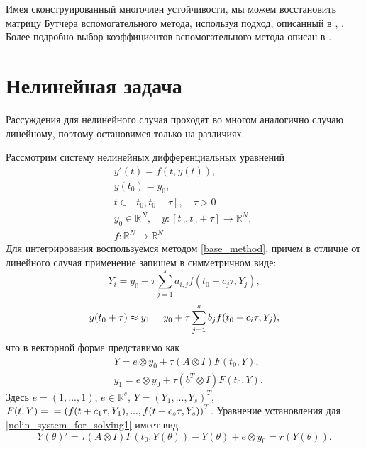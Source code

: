 \documentclass[a4paper,14pt]{extreport}
\begin{document}
Имея сконструированный многочлен устойчивости, мы можем восстановить матрицу Бутчера вспомогательного метода, используя подход, описанный в \cite{hairer}, \cite{Faleichik_amade}. Более подробно выбор коэффициентов вспомогательного метода описан в \cite{Bondar}.
  
  \section{Нелинейная задача}
  \label{s:non_linear_problem} 
  
Рассуждения для нелинейного случая проходят во многом аналогично случаю линейному, поэтому остановимся только на различиях.

Рассмотрим систему нелинейных дифференциальных уравнений
	\begin{equation}
	\begin{aligned}
	\label{nolin_main_problem}
	&y'(t)=f(t, y(t)),\\
	&y(t_0)=y_0,\\
	&t \in [t_0, t_0+\tau],\quad \tau>0 \\
	&y_0\in \mathbb{R}^N,\quad
	y:[t_0,t_0+\tau] \to \mathbb{R}^N,\quad\\
	&f:  \mathbb{R}^N \to \mathbb{R}^N.
	\end{aligned}
	\end{equation}
Для интегрирования воспользуемся методом \eqref{base_method}, причем в отличие от линейного случая применение запишем в симметричном виде:
	$$Y_i = y_0+\tau \sum_{j = 1}^s a_{i,j}f(t_0+c_j \tau,Y_j), $$
	$$y(t_0+\tau)\thickapprox y_1 = y_0 + \tau \sum_{j = 1}^s b_{j}f(t_0+c_i \tau,Y_j),$$
что в векторной форме представимо как
	\begin{equation}
	\begin{aligned}
	\label{nolin_system_for_solving1}
	&Y = e\otimes y_0 +\tau (A\otimes I)F(t_0,Y),\\
	&y_1 = e\otimes y_0 +\tau(b^T\otimes I)F(t_0,Y).
	\end{aligned}
	\end{equation}
Здесь $e = (1,..., 1)$, $e \in \mathbb R^s$,  $Y = (Y_1, ...,Y_s)^T$, $F(t, Y) =\\= \left(f(t+c_1 \tau,Y_1),..., f(t+c_s \tau,Y_s) \right)^T$.
Уравнение установления для \eqref{nolin_system_for_solving1} имеет вид
	\begin{equation}
	\label{nolin_estEquation} Y(\theta)'=\tau (A\otimes I)F(t_0,Y(\theta)) -Y(\theta)+ e\otimes y_0 = \tilde r(Y(\theta)).
	\end{equation}
\end{document}
